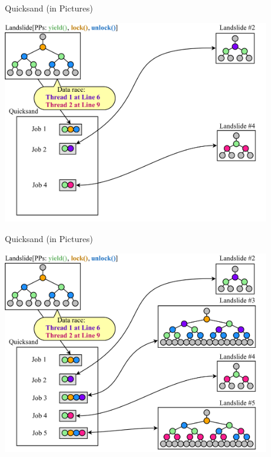 \documentclass[xcolor=dvipsnames]{beamer}
\begin{document}
\begin{frame}{Quicksand (in Pictures)}
	\begin{center}
	\vspace{-0.88em}
	\includegraphics[width=0.86\textwidth]{dr-jobs-3-alt.pdf}
	\end{center}
\end{frame}
\begin{frame}{Quicksand (in Pictures)}
	\begin{center}
	\vspace{-0.88em}
	\includegraphics[width=0.86\textwidth]{../../oopsla/dr-jobs-4.pdf}
	\end{center}
\end{frame}
\end{document}

